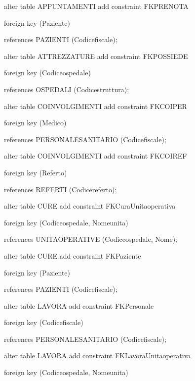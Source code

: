 \documentclass[a4paper,12pt]{report}
\begin{document}
\noindent alter table APPUNTAMENTI add constraint FKPRENOTA

     foreign key (Paziente)

     references PAZIENTI (Codice\textunderscore fiscale); \newline

\noindent alter table ATTREZZATURE add constraint FKPOSSIEDE

     foreign key (Codice\textunderscore ospedale)

     references OSPEDALI (Codice\textunderscore struttura); \newline

\noindent alter table COINVOLGIMENTI add constraint FKCOI\textunderscore PER

     foreign key (Medico)

     references PERSONALE\textunderscore SANITARIO (Codice\textunderscore fiscale); \newline

\noindent alter table COINVOLGIMENTI add constraint FKCOI\textunderscore REF

     foreign key (Referto)

     references REFERTI (Codice\textunderscore referto); \newline

\noindent alter table CURE add constraint FKCura\textunderscore Unita\textunderscore operativa

     foreign key (Codice\textunderscore ospedale, Nome\textunderscore unita)

     references UNITA\textunderscore OPERATIVE (Codice\textunderscore ospedale, Nome); \newline

\noindent alter table CURE add constraint FKPaziente

     foreign key (Paziente)

     references PAZIENTI (Codice\textunderscore fiscale); \newline

\noindent alter table LAVORA add constraint FKPersonale

     foreign key (Codice\textunderscore fiscale)

     references PERSONALE\textunderscore SANITARIO (Codice\textunderscore fiscale); \newline

\noindent alter table LAVORA add constraint FKLavora\textunderscore Unita\textunderscore operativa

     foreign key (Codice\textunderscore ospedale, Nome\textunderscore unita)
\end{document}
